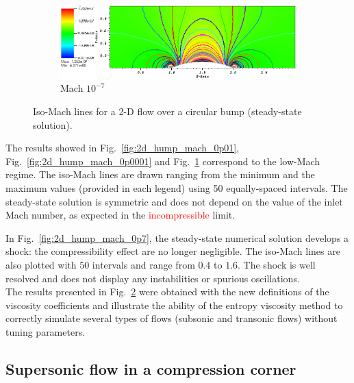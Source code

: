 \documentclass[preprint,10pt]{elsarticle}
\newcommand{\fig}[1]{Fig.~\ref{#1}}                      %
\newcommand{\tcr}[1]{\textcolor{red}{#1}}
\begin{document}
\begin{figure}[H]
        \begin{subfigure}[b]{0.495\textwidth}
                \centering
                \includegraphics[width=\textwidth]{Hump2D_mach_1em7.png}
                \caption{Mach $10^{-7}$}
                \label{fig:2d_hump_mach_0p0000001}
        \end{subfigure}
        \caption{Iso-Mach lines for a 2-D flow over a circular bump (steady-state solution).}
				\label{fig:2d_hump}
\end{figure}
%
The results showed in \fig{fig:2d_hump_mach_0p01}, \fig{fig:2d_hump_mach_0p0001} and \fig{fig:2d_hump_mach_0p0000001} correspond to the low-Mach regime. The iso-Mach lines are drawn ranging from the minimum and the maximum values (provided in each legend) using 50 equally-spaced intervals. The steady-state solution is symmetric and does not depend on the value of the inlet Mach number, as expected in the \tcr{incompressible} limit. 

In \fig{fig:2d_hump_mach_0p7}, the steady-state numerical solution develops a shock: the compressibility effect are no longer negligible. The iso-Mach lines are also plotted with $50$ intervals and range from $0.4$ to $1.6$. The shock is well resolved and does not display any instabilities or spurious oscillations. \\
The results presented in \fig{fig:2d_hump} were obtained with the new definitions of the viscosity coefficients and illustrate the ability of the entropy viscosity method to correctly simulate several types of flows (subsonic and transonic flows) without tuning parameters.

\subsection{Supersonic flow in a compression corner} \label{sec:corner}
\end{document}
